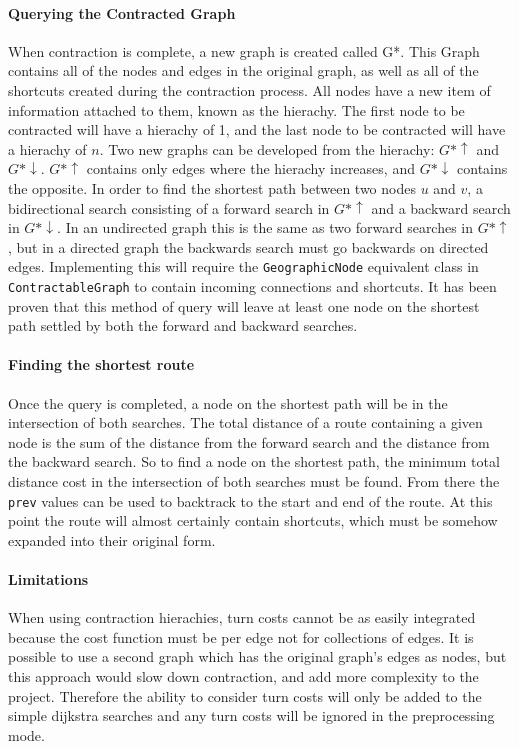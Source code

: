 \documentclass[11pt,twoside,a4paper]{report}
\begin{document}
\paragraph{Querying the Contracted Graph}
When contraction is complete, a new graph is created called G*. This Graph contains all of the nodes and edges in the original graph, as well as all of the shortcuts created during the contraction process.
All nodes have a new item of information attached to them, known as the hierachy. The first node to be contracted will have a hierachy of 1, and the last node to be contracted will have a hierachy of $n$. 
Two new graphs can be developed from the hierachy:
$G*\uparrow$ and $G*\downarrow$. $G*\uparrow$ contains only edges where the hierachy increases, and $G*\downarrow$ contains the opposite. In order to find the shortest path between two nodes $u$ and $v$, a bidirectional search
 consisting of a forward search in $G*\uparrow$ and a backward search in $G*\downarrow$. In an undirected graph this is the same as two forward searches in $G*\uparrow$, but in a directed graph the backwards search must go backwards on directed edges.
Implementing this will require the \texttt{GeographicNode} equivalent class in \texttt{ContractableGraph} to contain incoming connections and shortcuts. It has been proven\cite{Geisberger2012} that this method of query will leave at least one node on the shortest path settled by both the forward and backward searches.
\paragraph{Finding the shortest route}
Once the query is completed, a node on the shortest path will be in the intersection of both searches. The total distance of a route containing a given node is the sum of the distance from the forward search and the distance from the backward search. So to find a node on the shortest path,
the minimum total distance cost in the intersection of both searches must be found. From there the \texttt{prev} values can be used to backtrack to the start and end of the route. At this point the route will almost certainly contain shortcuts, which must be somehow expanded into their original form.
\paragraph{Limitations}
When using contraction hierachies, turn costs cannot be as easily integrated because the cost function must be per edge not for collections of edges. It is possible to use a second graph which has the original graph's edges as nodes, but this approach would slow down contraction, and add more complexity to the project.
Therefore the ability to consider turn costs will only be added to the simple dijkstra searches and any turn costs will be ignored in the preprocessing mode.
\end{document}
